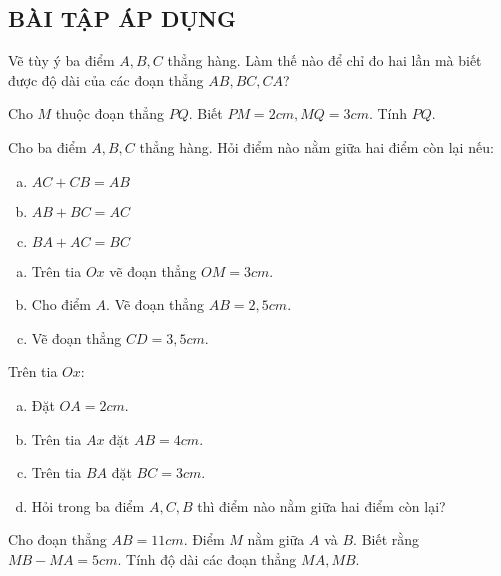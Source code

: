 \subsection{BÀI TẬP ÁP DỤNG}
\begin{bt}
Vẽ tùy ý ba điểm $A, B, C$ thẳng hàng. Làm thế nào để chỉ đo hai lần mà biết được độ dài của các đoạn thẳng $AB, BC, CA$?
\end{bt}   \begin{bt}
Cho $M$ thuộc đoạn thẳng $PQ$. Biết $PM = 2cm, MQ = 3 cm$. Tính $PQ$.
\end{bt}   \begin{bt}
Cho ba điểm $A, B, C$ thẳng hàng. Hỏi điểm nào nằm giữa hai điểm còn lại nếu:
\begin{enumerate}[a)]
\item $AC + CB = AB$
\item $AB + BC = AC$
\item $BA + AC = BC$
\end{enumerate}
\end{bt}   \begin{bt} 
\begin{enumerate}[a)]
\item	Trên tia $Ox$ vẽ đoạn thẳng $OM = 3cm$.
\item	Cho điểm $A$. Vẽ đoạn thẳng $AB = 2,5cm$.
\item	Vẽ đoạn thẳng $CD = 3,5 cm$.
\end{enumerate}
\end{bt}   \begin{bt}
Trên tia $Ox$:
\begin{enumerate}[a)]
\item	Đặt $OA = 2 cm$.
\item	Trên tia $Ax$ đặt $AB = 4cm$.
\item	Trên tia $BA$ đặt $BC = 3 cm$.
\item	Hỏi trong ba điểm $A, C, B$ thì điểm nào nằm giữa hai điểm còn lại?
\end{enumerate}
\end{bt}   \begin{bt}
Cho đoạn thẳng $AB = 11cm$. Điểm $M$ nằm giữa $A$ và $B$. Biết rằng $MB - MA = 5cm$. Tính độ dài các đoạn thẳng $MA, MB$.

\end{bt}

